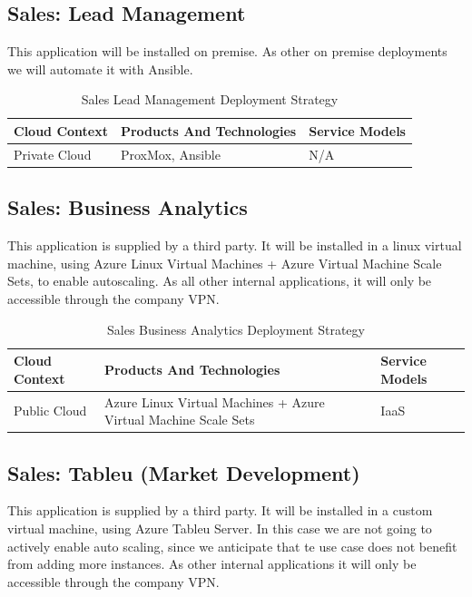 \documentclass{llncs}
\begin{document}
\subsection{Sales: Lead Management}
This application will be installed on premise. As other on premise deployments we will automate it with Ansible.
\begin{table}[h!]
    \centering
    \begin{tabular}{lll}
        \hline
        \textbf{Cloud Context} & \textbf{Products And Technologies} & \textbf{Service Models} \\
        \hline
        Private Cloud          & ProxMox, Ansible                   & N/A                     \\
        \hline
    \end{tabular}
    \caption{Sales Lead Management Deployment Strategy}
\end{table}

\subsection{Sales: Business Analytics}
This application is supplied by a third party. It will be installed in a linux virtual machine, using Azure Linux Virtual Machines + Azure Virtual Machine Scale Sets, to enable autoscaling.
As all other internal applications, it will only be accessible through the company VPN.\\

\begin{table}[h!]
    \centering
    \begin{tabular}{lll}
        \hline
        \textbf{Cloud Context} & \textbf{Products And Technologies}                              & \textbf{Service Models} \\
        \hline
        Public Cloud           & Azure Linux Virtual Machines + Azure Virtual Machine Scale Sets & IaaS                    \\
    \end{tabular}
    \caption{Sales Business Analytics Deployment Strategy}
\end{table}

\subsection{Sales: Tableu (Market Development)}
This application is supplied by a third party. It will be installed in a custom virtual machine, using Azure Tableu Server.
In this case we are not going to actively enable auto scaling, since we anticipate that te use case does not benefit from adding more instances.
As other internal applications it will only be accessible through the company VPN.\\
\end{document}

